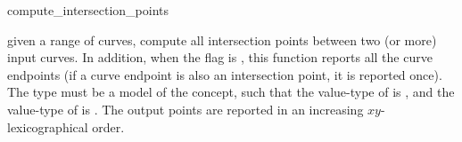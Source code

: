 \ccRefPageBegin

\begin{ccRefFunction}{compute_intersection_points}


{given a range of curves, compute all intersection points between two (or more)
 input curves.
  In addition, when the flag  is , 
  this function reports all the curve endpoints (if a curve endpoint is also
  an intersection point, it is reported once). 
  The  type must be a model
 of the  concept, such that the value-type of
  is , and the value-type of
  is .
 The output points are reported in an increasing $xy$-lexicographical order.}

\end{ccRefFunction}

\ccRefPageEnd

